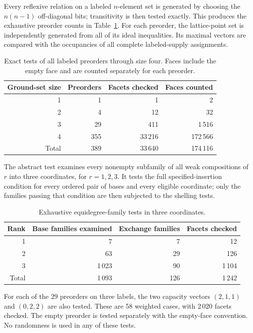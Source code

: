 \documentclass[11pt]{article}
\numberwithin{equation}{section}
\theoremstyle{definition}
\theoremstyle{remark}
\begin{document}
Every reflexive relation on a labeled $n$-element set is generated by choosing
the $n(n-1)$ off-diagonal bits; transitivity is then tested exactly. This
produces the exhaustive preorder counts in Table~\ref{tab:verification}.
For each preorder, the lattice-point set is independently generated from all
of its ideal inequalities. Its maximal vectors are compared with the
occupancies of all complete labeled-supply assignments.

\begin{table}[htbp]
\centering
\begin{tabular}{@{}rrrr@{}}
\toprule
Ground-set size & Preorders & Facets checked & Faces counted\\
\midrule
1 & 1 & 1 & 2\\
2 & 4 & 12 & 32\\
3 & 29 & 411 & 1\,516\\
4 & 355 & 33\,216 & 172\,566\\
\midrule
Total & 389 & 33\,640 & 174\,116\\
\bottomrule
\end{tabular}
\caption{Exact tests of all labeled preorders through size four. Faces
include the empty face and are counted separately for each preorder.}
\label{tab:verification}
\end{table}

The abstract test examines every nonempty subfamily of all weak compositions
of $r$ into three coordinates, for $r=1,2,3$. It tests the full
specified-insertion condition for every ordered pair of bases and every
eligible coordinate; only the families passing that condition are then
subjected to the shelling tests.

\begin{table}[htbp]
\centering
\begin{tabular}{@{}rrrr@{}}
\toprule
Rank & Base families examined & Exchange families & Facets checked\\
\midrule
1 & 7 & 7 & 12\\
2 & 63 & 29 & 126\\
3 & 1\,023 & 90 & 1\,104\\
\midrule
Total & 1\,093 & 126 & 1\,242\\
\bottomrule
\end{tabular}
\caption{Exhaustive equidegree-family tests in three coordinates.}
\label{tab:abstract-tests}
\end{table}

For each of the 29 preorders on three labels, the two capacity vectors
$(2,1,1)$ and $(0,2,2)$ are also tested. These are 58 weighted cases, with
2\,020 facets checked. The empty preorder is tested separately with the
empty-face convention. No randomness is used in any of these tests.
\end{document}

